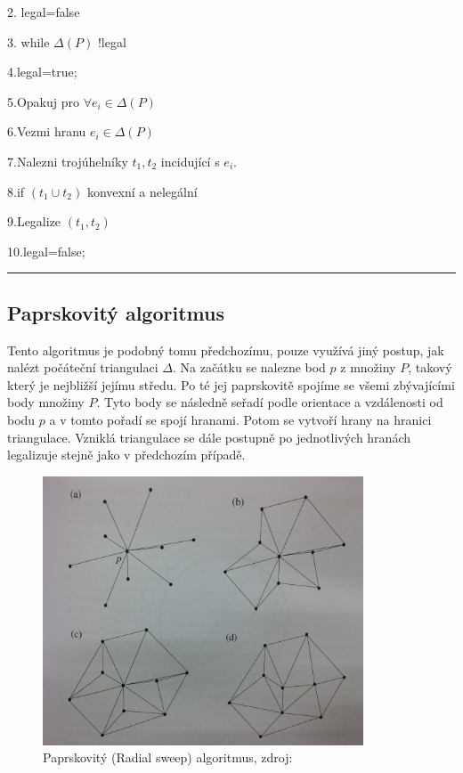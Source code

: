 \documentclass[12pt,a4paper]{article}
\begin{document}
2. legal=false

3. while $\Delta(P)$ !legal

4.\indent legal=true;

5.\indent Opakuj pro $\forall e_i \in \Delta(P)$

6.\indent \indent Vezmi hranu $e_i \in \Delta(P)$

7.\indent \indent Nalezni trojúhelníky $t_1,t_2$ incidující s $e_i$.

8.\indent \indent if $(t_1 \cup t_2)$ konvexní a nelegální

9.\indent \indent \indent  Legalize $(t_1,t_2)$

10.\indent \indent \indent legal=false;
\newline
\hrule

\newpage
\subsection{Paprskovitý algoritmus}

Tento algoritmus je podobný tomu předchozímu, pouze využívá jiný postup, jak nalézt počáteční triangulaci $\Delta$. Na začátku se nalezne bod $p$ z množiny $P$, takový který je nejbližší jejímu středu. Po té jej paprskovitě spojíme se všemi zbývajícími body množiny $P$. Tyto body se následně seřadí podle orientace a vzdálenosti od bodu $p$ a v tomto pořadí se spojí hranami. Potom se vytvoří hrany na hranici triangulace. Vzniklá triangulace se dále postupně po jednotlivých hranách legalizuje stejně jako v předchozím případě.

\begin{figure}[h!]
\centering
\includegraphics[width=0.85\textwidth, angle=90]{img/rsweep.jpg}
\caption{Paprskovitý (Radial sweep) algoritmus, zdroj: \cite{triangulation}}
\label{fig:rsweep}
\end{figure}
\end{document}
